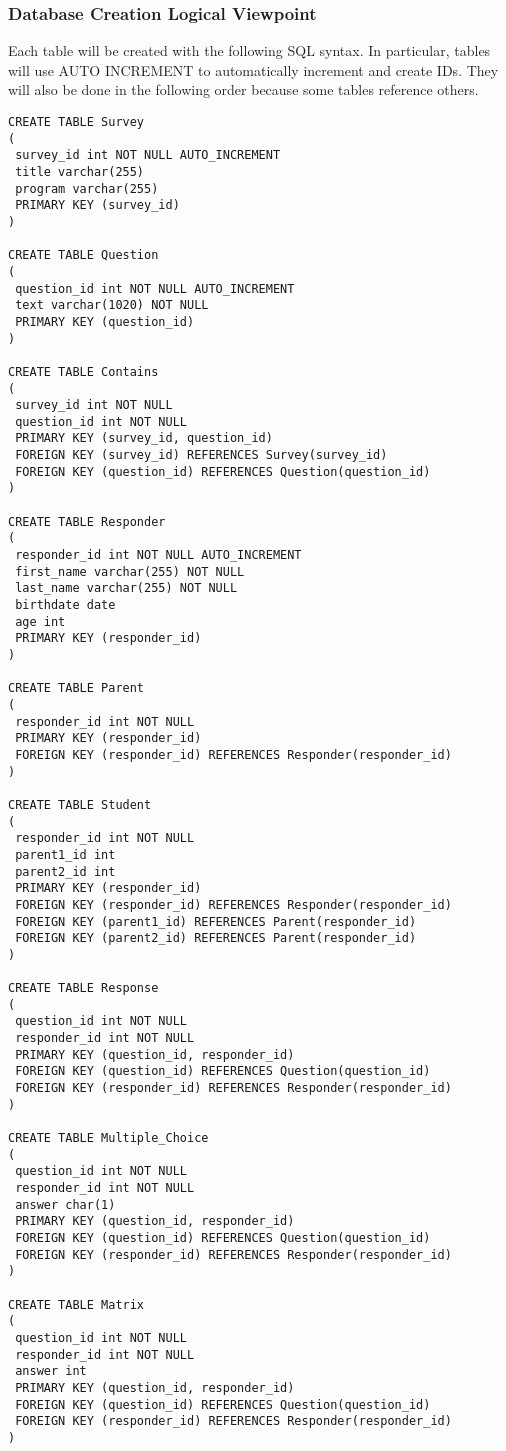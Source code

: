 \documentclass[letterpaper,10pt,serif, draftclsnofoot,onecolumn, compsoc, titlepage]{IEEEtran}
\begin{document}
\subsubsection{Database Creation Logical Viewpoint}
Each table will be created with the following SQL syntax.
In particular, tables will use AUTO INCREMENT to automatically increment and create IDs.
They will also be done in the following order because some tables reference others.
\lstset{language=SQL,breaklines=true,breakatwhitespace=true}
\begin{lstlisting}
CREATE TABLE Survey
(
 survey_id int NOT NULL AUTO_INCREMENT
 title varchar(255)
 program varchar(255)
 PRIMARY KEY (survey_id)
)

CREATE TABLE Question
(
 question_id int NOT NULL AUTO_INCREMENT
 text varchar(1020) NOT NULL
 PRIMARY KEY (question_id)
)

CREATE TABLE Contains
(
 survey_id int NOT NULL
 question_id int NOT NULL
 PRIMARY KEY (survey_id, question_id)
 FOREIGN KEY (survey_id) REFERENCES Survey(survey_id)
 FOREIGN KEY (question_id) REFERENCES Question(question_id)
)

CREATE TABLE Responder
(
 responder_id int NOT NULL AUTO_INCREMENT
 first_name varchar(255) NOT NULL
 last_name varchar(255) NOT NULL
 birthdate date
 age int
 PRIMARY KEY (responder_id)
)

CREATE TABLE Parent
(
 responder_id int NOT NULL
 PRIMARY KEY (responder_id)
 FOREIGN KEY (responder_id) REFERENCES Responder(responder_id)
)

CREATE TABLE Student
(
 responder_id int NOT NULL
 parent1_id int
 parent2_id int
 PRIMARY KEY (responder_id)
 FOREIGN KEY (responder_id) REFERENCES Responder(responder_id)
 FOREIGN KEY (parent1_id) REFERENCES Parent(responder_id)
 FOREIGN KEY (parent2_id) REFERENCES Parent(responder_id)
)

CREATE TABLE Response
(
 question_id int NOT NULL
 responder_id int NOT NULL
 PRIMARY KEY (question_id, responder_id)
 FOREIGN KEY (question_id) REFERENCES Question(question_id)
 FOREIGN KEY (responder_id) REFERENCES Responder(responder_id)
)

CREATE TABLE Multiple_Choice
(
 question_id int NOT NULL
 responder_id int NOT NULL
 answer char(1)
 PRIMARY KEY (question_id, responder_id)
 FOREIGN KEY (question_id) REFERENCES Question(question_id)
 FOREIGN KEY (responder_id) REFERENCES Responder(responder_id)
)

CREATE TABLE Matrix
(
 question_id int NOT NULL
 responder_id int NOT NULL
 answer int
 PRIMARY KEY (question_id, responder_id)
 FOREIGN KEY (question_id) REFERENCES Question(question_id)
 FOREIGN KEY (responder_id) REFERENCES Responder(responder_id)
)


\end{lstlisting}
\end{document}

